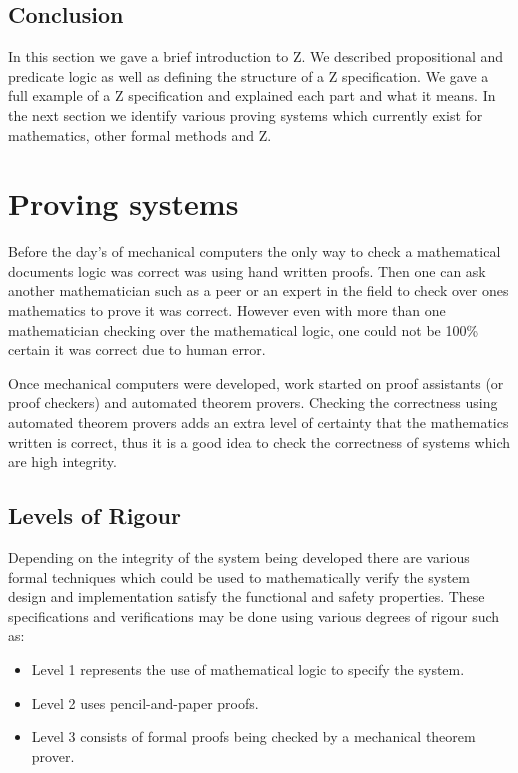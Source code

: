 \subsection{Conclusion}

In this section we gave a brief introduction to Z. We described
 propositional and predicate logic as well as defining the
structure of a Z specification. We gave a full example of a Z specification and
explained each part and what it means. In the next section we identify various
proving systems which currently exist for mathematics, other formal methods and
Z.

\section{Proving systems}

Before the day's of mechanical computers the only way to check a mathematical
documents logic was correct was using hand written proofs. Then one can ask
another mathematician such as a peer or an expert in the field to check over
ones mathematics to prove it was correct. However even with more than one
mathematician checking over the mathematical logic, one could not be 100\%
certain it was correct due to human error. 

Once mechanical computers were developed, work started on proof assistants (or
proof checkers) and automated theorem provers. Checking the correctness using
automated theorem provers adds an extra level of certainty
that the mathematics written is correct, thus it is a good idea to check the
correctness of systems which are high integrity.

\subsection{Levels of Rigour}

Depending on the integrity of the system being developed there are various
formal techniques which could be used to mathematically verify the system design
and implementation satisfy the functional and safety properties. These
specifications and verifications may be done using various degrees of rigour
such as:

\begin{itemize}
\item Level 1 represents the use of mathematical logic to specify the system.
\item Level 2 uses pencil-and-paper proofs.
\item Level 3 consists of formal proofs being checked by a mechanical theorem
prover.
\end{itemize}

